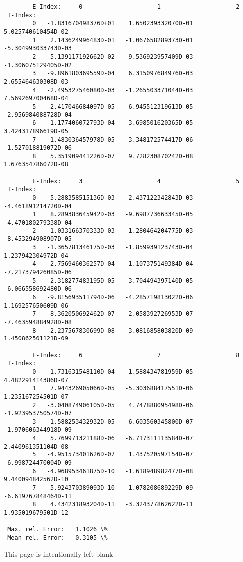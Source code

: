 \documentclass[12pt,dvipdfmx]{article}
\begin{document}
\begin{small}\begin{verbatim}
        E-Index:     0                     1                     2
 T-Index:
        0   -1.831670498376D+01    1.650239332070D-01    5.025740610454D-02
        1    2.143624996483D-01   -1.067658289373D-01   -5.304993033743D-03
        2    5.139117192662D-02    9.536923957409D-03   -1.306075129405D-02
        3   -9.896180369559D-04    6.315097684976D-03    2.655464630308D-03
        4   -2.495327546080D-03   -1.265503371044D-03    7.569269700468D-04
        5   -2.417046684097D-05   -6.945512319613D-05   -2.956984088728D-04
        6    1.177406072793D-04    3.698501620365D-05    3.424317896619D-05
        7   -1.483036457978D-05   -3.348172574417D-06   -1.527018819072D-06
        8    5.351909441226D-07    9.728230870242D-08    1.676354786072D-08

        E-Index:     3                     4                     5
 T-Index:
        0    5.288358515136D-03   -2.437122342843D-03   -4.461891214720D-04
        1    8.289383645942D-03   -9.698773663345D-05   -4.470180279338D-04
        2   -1.033166370333D-03    1.280464204775D-03   -8.453294908907D-05
        3   -1.365781346175D-03   -1.859939123743D-04    1.237942304972D-04
        4    2.756946036257D-04   -1.107375149384D-04   -7.217379426085D-06
        5    2.318277483195D-05    3.704494397140D-05   -6.066558692480D-06
        6   -9.815693511794D-06   -4.285719813022D-06    1.169257650609D-06
        7    8.362050692462D-07    2.058392726953D-07   -7.463594884928D-08
        8   -2.237567830699D-08   -3.081685803820D-09    1.450862501121D-09

        E-Index:     6                     7                     8
 T-Index:
        0    1.731631548110D-04   -1.588434781959D-05    4.482291414386D-07
        1    7.944326905066D-05   -5.303688417551D-06    1.235167254501D-07
        2   -3.040874906105D-05    4.747888095498D-06   -1.923953750574D-07
        3   -1.588253432932D-05    6.603560345800D-07   -1.970606344918D-09
        4    5.769971321188D-06   -6.717311113584D-07    2.440961351104D-08
        5   -4.951573401626D-07    1.437520597154D-07   -6.998724470004D-09
        6   -4.968953461875D-10   -1.618948982477D-08    9.440094842562D-10
        7    5.924370389093D-10    1.078208689229D-09   -6.619767848464D-11
        8    4.434231893204D-11   -3.324377862622D-11    1.935019679501D-12

 Max. rel. Error:   1.1026 \%
 Mean rel. Error:   0.3105 \%

\end{verbatim}\end{small}
\newpage
This page is intentionally left blank
\newpage
\end{document}
